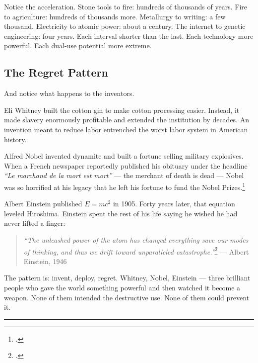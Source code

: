 \vspace{0.5cm}

Notice the acceleration. Stone tools to fire: hundreds of thousands of years. Fire to agriculture: hundreds of thousands more. Metallurgy to writing: a few thousand. Electricity to atomic power: about a century. The internet to genetic engineering: four years. Each interval shorter than the last. Each technology more powerful. Each dual-use potential more extreme.

\subsection*{The Regret Pattern}
\label{spine:cw-the-regret-pattern}

And notice what happens to the inventors.

Eli Whitney built the cotton gin to make cotton processing easier. Instead, it made slavery enormously profitable and extended the institution by decades. An invention meant to reduce labor entrenched the worst labor system in American history.

Alfred Nobel invented dynamite and built a fortune selling military explosives. When a French newspaper reportedly published his obituary under the headline \textit{``Le marchand de la mort est mort''} --- the merchant of death is dead --- Nobel was so horrified at his legacy that he left his fortune to fund the Nobel Prizes.\footcite{fant1993}

Albert Einstein published $E = mc^2$ in 1905. Forty years later, that equation leveled Hiroshima. Einstein spent the rest of his life saying he wished he had never lifted a finger:

\begin{quote}
\textit{``The unleashed power of the atom has changed everything save our modes of thinking, and thus we drift toward unparalleled catastrophe.''}\footcite{einstein1960peace} --- Albert Einstein, 1946
\end{quote}

The pattern is: invent, deploy, regret. Whitney, Nobel, Einstein --- three brilliant people who gave the world something powerful and then watched it become a weapon. None of them intended the destructive use. None of them could prevent it.

\vspace{1cm}\noindent\rule{0.5\textwidth}{0.5pt}\vspace{0.5cm}

